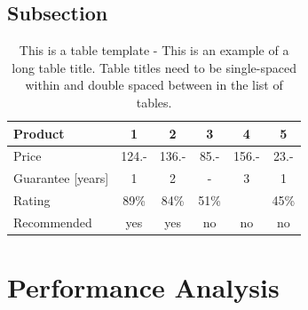 \subsection{Subsection}
\begin{table}[H]
\centering
\caption{This is a table template - This is an example of a long table title.  Table titles need to be single-spaced within and double spaced between in the list of tables.}
\begin{tabular}{|l|c|c|c|c|c|}
\hline
Product & 1 & 2 & 3 & 4 & 5\\
\hline
Price & 124.- & 136.- & 85.- & 156.- & 23.-\\
Guarantee [years] & 1 & 2 & - & 3 & 1\\
Rating & 89\% & 84\% & 51\% & & 45\%\\
\hline
\hline
Recommended & yes & yes & no & no & no\\
\hline
\end{tabular}
\label{tab:template1}
\end{table}


\section{Performance Analysis}



